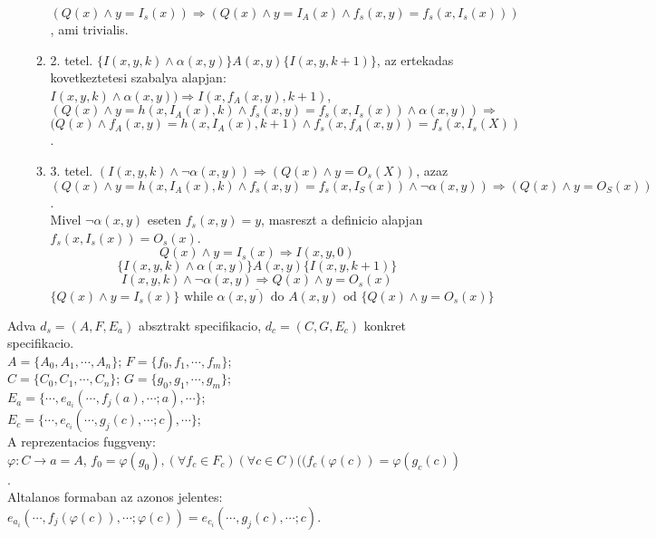 \documentclass[a4paper,10pt]{article}
\begin{document}
\begin{enumerate}
\begin{enumerate}
$(Q(x) \wedge y=I_s(x)) \Rightarrow (Q(x) \wedge y=I_A(x) \wedge f_s(x,y) = f_s(x, I_s(x)))$, ami trivialis.
\item 2. tetel. $\lbrace I(x,y,k) \wedge \alpha(x,y)\rbrace A(x,y) \lbrace I(x,y,k+1)\rbrace$, az ertekadas kovetkeztetesi szabalya alapjan:\\
$I(x,y,k) \wedge \alpha(x,y)) \Rightarrow I(x,f_A(x,y), k+1)$,\\
$(Q(x)\wedge y=h(x,I_A(x), k)\wedge f_s(x,y) = f_s(x, I_s(x)) \wedge \alpha(x,y)) \Rightarrow$\\
$(Q(x) \wedge f_A(x,y)=h(x, I_A(x), k+1) \wedge f_s(x, f_A(x,y)) = f_s(x,I_s(X))$.
\item 3. tetel. $(I(x,y,k) \wedge \neg\alpha(x,y)) \Rightarrow (Q(x) \wedge y=O_s(X))$, azaz\\
$(Q(x) \wedge y=h(x,I_A(x), k) \wedge f_s(x,y) = f_s(x,I_S(x)) \wedge \neg\alpha(x,y)) \Rightarrow (Q(x) \wedge y=O_S(x))$.\\
Mivel $\neg\alpha(x,y)$ eseten $f_s(x,y)=y$, masreszt a definicio alapjan $f_s(x,I_s(x)) = O_s(x)$.
$$Q(x) \wedge y=I_s(x) \Rightarrow I(x,y,0)$$
$$\lbrace I(x,y,k) \wedge \alpha(x,y)\rbrace A(x,y) \lbrace I(x,y,k+1) \rbrace$$
$$\underline{I(x,y,k) \wedge \neg\alpha(x,y) \Rightarrow Q(x) \wedge y=O_s(x)}$$
$$\lbrace Q(x) \wedge y=I_s(x)\rbrace \text{ while } \alpha(x,y) \text{ do } A(x,y) \text{ od } \lbrace Q(x) \wedge y=O_s(x)\rbrace$$
\end{enumerate}
\end{enumerate}
Adva $d_s=(A, F, E_a)$ absztrakt specifikacio, $d_c=(C,G,E_c)$ konkret specifikacio.\\
\indent $A=\lbrace A_0, A_1, \cdots, A_n\rbrace$; \indent $F=\lbrace f_0, f_1, \cdots, f_m\rbrace$;\\
\indent $C=\lbrace C_0, C_1, \cdots, C_n\rbrace$; \indent $G=\lbrace g_0, g_1, \cdots, g_m\rbrace$;\\
\indent $E_a=\lbrace\cdots, e_{a_i}(\cdots, f_j(a), \cdots; a), \cdots\rbrace$;\\
\indent $E_c=\lbrace\cdots, e_{c_i}(\cdots, g_j(c), \cdots; c), \cdots\rbrace$;\\
A reprezentacios fuggveny:\\
$\varphi: C\to a=A$, $f_0=\varphi(g_0), (\forall f_c\in F_c)(\forall c\in C) ((f_c(\varphi(c))=\varphi(g_c(c))$.\\
Altalanos formaban az azonos jelentes:\\
$e_{a_i}(\cdots, f_j(\varphi(c)), \cdots;\varphi(c)) = e_{c_i}(\cdots, g_j(c), \cdots;c)$.\\
\end{document}
